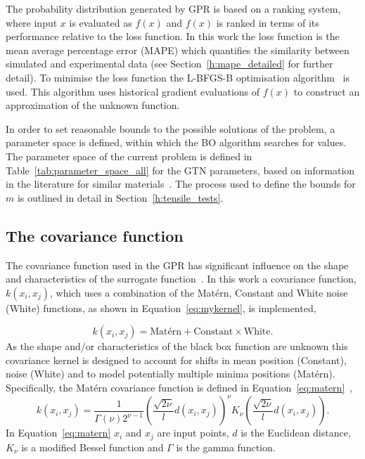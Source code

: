 \documentclass[preprint, review, 12pt]{elsarticle}
\begin{document}
	The probability distribution generated by GPR is based on a ranking system, where input $x$ is evaluated as $f(x)$ and $f(x)$ is ranked in terms of its performance relative to the loss function.
	In this work the loss function is the mean average percentage error (MAPE) which quantifies the similarity between simulated and experimental data (see Section~\ref{h:mape_detailed} for further detail).
	To minimise the loss function the L-BFGS-B optimisation algorithm~\cite{ZHU1997} is used.
	This algorithm uses historical gradient evaluations of $f(x)$ to construct an approximation of the unknown function.

	In order to set reasonable bounds to the possible solutions of the problem, a parameter space is defined, within which the BO algorithm searches for values.
	The parameter space of the current problem is defined in Table~\ref{tab:parameter_space_all} for the GTN parameters, based on information in the literature for similar materials~\cite{KIRAN2014,MEADE2020,DASSAULT2021}.
	The process used to define the bounds for $m$ is outlined in detail in Section~\ref{h:tensile_tests}.

	

	\subsection{The covariance function}
	\label{h:covariance_function}

	The covariance function used in the GPR has significant influence on the shape and characteristics of the surrogate function~\cite{MONGAN2022}.
	In this work a covariance function, $k(x_i, x_j)$, which uses a combination of the Mat\'ern, Constant and White noise (White) functions, as shown in Equation~\ref{eq:mykernel}, is implemented,

	\begin{equation}
		k(x_i, x_j) = \text{Mat\'ern} + \text{Constant} \times \text{White}.
		\label{eq:mykernel}
	\end{equation}
	As the shape and/or characteristics of the black box function are unknown this covariance kernel is designed to account for shifts in mean position (Constant), noise (White) and to model potentially multiple minima positions (Mat\'ern).
	Specifically, the Mat\'ern covariance function is defined in Equation~\ref{eq:matern}~\cite{PEDREGOSA2011},
	\begin{equation}
		k(x_i, x_j) = \frac{1}{\Gamma \left( \nu \right)2^{\nu-1}} \left( \frac{\sqrt{2\nu}}{l} d\left( x_i, x_j \right) \right)^{\nu}K_{\nu} \left( \frac{\sqrt{2\nu}}{l} d\left( x_i, x_j \right) \right).
		\label{eq:matern}
	\end{equation}
	In Equation~\ref{eq:matern} $x_i$ and $x_j$ are input points, $d$ is the Euclidean distance, $K_{\nu}$ is a modified Bessel function and $\Gamma$ is the gamma function.
\end{document}

